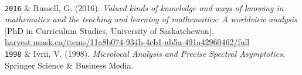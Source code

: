 \documentclass[9pt,letterpaper]{article}
\newcommand{\Year}[1]{\fontsize{10pt}{0}\selectfont \texttt{#1}}
\newcommand{\Website}[1]{\href{https://#1}{#1}}
\begin{document}
\begin{EntriesTableYear}
  \\ %

  \Year{2016} & Russell, G. (2016).  \textit{Valued kinds of knowledge
    and ways of knowing in mathematics and the teaching and learning
    of mathematics: A worldview analysis} [PhD in Curriculum Studies,
  University of Saskatchewan]. %
  \newline %
  \Website{harvest.usask.ca/items/11a8b074-934b-4cb1-ab5a-491a42960462/full} %
  \\ %
  \Year{1998} & Ivrii, V. (1998).  \textit{Microlocal Analysis and
    Precise Spectral Asymptotics}.  Springer Science \& Business
  Media. %
\end{EntriesTableYear}
\end{document}
